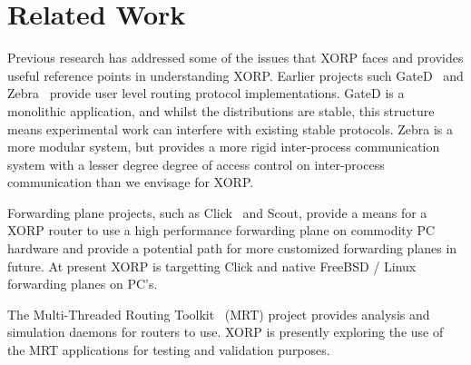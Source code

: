 
\section{Related Work}

Previous research has addressed some of the issues that XORP faces and
provides useful reference points in understanding XORP.  Earlier
projects such GateD~\cite{gated} and Zebra~\cite{zebra} provide user
level routing protocol implementations.  GateD is a monolithic
application, and whilst the distributions are stable, this structure
means experimental work can interfere with existing stable protocols.
Zebra is a more modular system, but provides a more rigid
inter-process communication system with a lesser degree degree of
access control on inter-process communication than we envisage for
XORP.

Forwarding plane projects, such as Click~\cite{click} and Scout, 
provide a means
for a XORP router to use a high performance forwarding plane on
commodity PC hardware and provide a potential path for more customized
forwarding planes in future.  At present XORP is targetting Click and
native FreeBSD / Linux forwarding planes on PC's.

The Multi-Threaded Routing Toolkit~\cite{mrt} (MRT) project provides
analysis and simulation daemons for routers to use.  XORP is presently
exploring the use of the MRT applications for testing and validation
purposes.

